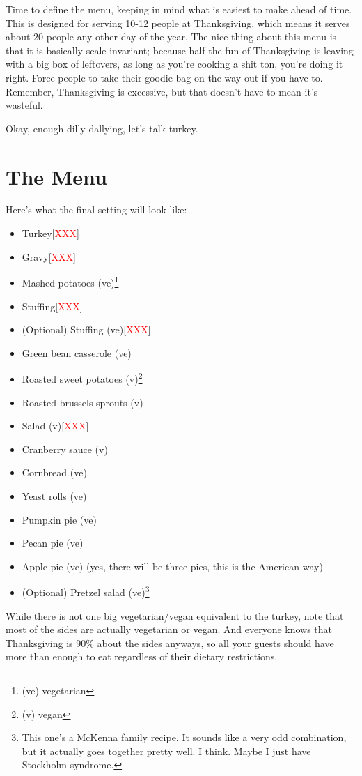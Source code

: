 \documentclass[12pt]{article}
\newcommand{\TODO}{[\textcolor{red}{XXX}]}
\begin{document}
	Time to define the menu, keeping in mind what is easiest to make ahead of time. This is designed for serving 10-12 people at Thanksgiving, which means it serves about 20 people any other day of the year. The nice thing about this menu is that it is basically scale invariant; because half the fun of Thanksgiving is leaving with a big box of leftovers, as long as you're cooking a shit ton, you're doing it right. Force people to take their goodie bag on the way out if you have to. Remember, Thanksgiving is excessive, but that doesn't have to mean it's wasteful.
	
	Okay, enough dilly dallying, let's talk turkey.
	
	\newpage
	
	\section{The Menu}
	Here's what the final setting will look like:
	\begin{itemize}
		\item Turkey\TODO
		\item Gravy\TODO
		\item Mashed potatoes (ve)\footnote{(ve) vegetarian}
		\item Stuffing\TODO
		\item (Optional) Stuffing (ve)\TODO
		\item Green bean casserole (ve)
		\item Roasted sweet potatoes (v)\footnote{(v) vegan}
		\item Roasted brussels sprouts (v)
		\item Salad (v)\TODO
		\item Cranberry sauce (v)
		\item Cornbread (ve)
		\item Yeast rolls (ve)
		\item Pumpkin pie (ve)
		\item Pecan pie (ve)
		\item Apple pie (ve) (yes, there will be three pies, this is the American way)
		\item (Optional) Pretzel salad (ve)\footnote{This one's a McKenna family recipe. It sounds like a very odd combination, but it actually goes together pretty well. I think. Maybe I just have Stockholm syndrome.}
	\end{itemize}
	
	While there is not one big vegetarian/vegan equivalent to the turkey, note that most of the sides are actually vegetarian or vegan. And everyone knows that Thanksgiving is 90\% about the sides anyways, so all your guests should have more than enough to eat regardless of their dietary restrictions.
	
\end{document}
